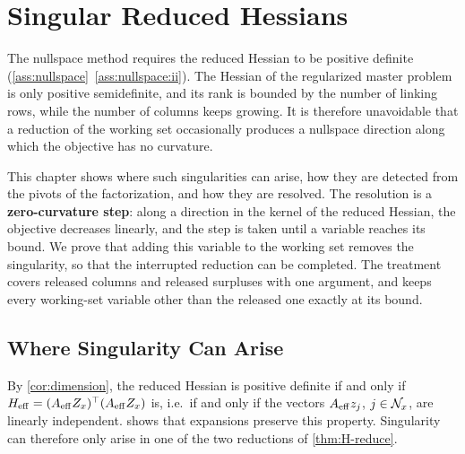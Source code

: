 \chapter{Singular Reduced Hessians}
\label{chap:singular}

\vspace*{\fill}

The nullspace method requires the reduced Hessian to be positive definite
(\cref{ass:nullspace}~\ref{ass:nullspace:ii}). The Hessian of the regularized master problem is only positive
semidefinite, and its rank is bounded by the number of linking rows, while the number of
columns keeps growing. It is therefore unavoidable that a reduction of the working set
occasionally produces a nullspace direction along which the objective has no curvature.

\medskip

This chapter shows where such singularities can arise, how they are detected from the
pivots of the factorization, and how they are resolved. The resolution is a
\textbf{zero-curvature step}: along a direction in the kernel of the reduced Hessian, the
objective decreases linearly, and the step is taken until a variable reaches its bound. We
prove that adding this variable to the working set removes the singularity, so that the
interrupted reduction can be completed. The treatment covers released columns and released
surpluses with one argument, and keeps every working-set variable other than the released
one exactly at its bound.

\vspace*{\fill}

\newpage


\section{Where Singularity Can Arise}
\label{sec:where-singular}

By \cref{cor:dimension}, the reduced Hessian is positive definite if and only if
$H_{\mathrm{eff}} = (A_{\mathrm{eff}} Z_x)^\top(A_{\mathrm{eff}} Z_x)$ is, i.e.\ if and only if the vectors
$A_{\mathrm{eff}} z_j$, $j\in\mathcal{N}_x$, are linearly independent.  shows that expansions
preserve this property. Singularity can therefore only arise in one of the two reductions
of \cref{thm:H-reduce}.

